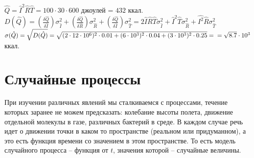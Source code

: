\documentclass[russian, 12pt, fleqn]{article}
\begin{document}
$\hat{Q} = \hat{I}^2 \hat{R} \hat{T} = 100\cdot30\cdot600$ джоулей = $432$ ккал.\\
$D(\hat{Q}) = (\frac{\delta \hat{Q}}{\delta \hat{I}}) \sigma^2_{\hat{I}} + (\frac{\delta \hat{Q}}{\delta \hat{R}}) \sigma^2_{\hat{R}} + (\frac{\delta \hat{Q}}{\delta \hat{I}}) \sigma^2_{\hat{T}} = 2\hat{I}\hat{R}\hat{T} \sigma_{\hat{I}}^2 + \hat{I}^2\hat{T} \sigma_{\hat{R}}^2  + \hat{I^2}\hat{R}\sigma_{\hat{T}}^2$\\
$\sigma(\hat{Q}) = \sqrt{D(\hat{Q})} = \sqrt{(2\cdot12\cdot 10^6)^2\cdot 0.01 + (6\cdot 10^3)^2 \cdot 0.04 + (3 \cdot 10^3)^2 \cdot 0.25} = \\ = \sqrt{8.7} \cdot 10^3$ ккал.
\section{Случайные процессы}
При изучении различных явлений мы сталкиваемся с процессами, течение которых заранее не можем предсказать: колебание высоты полета, движение отдельной молекулы в газе, различных бактерий в %
среде. В каждом случае речь идет о движении точки в каком то пространстве (реальном или придуманном), а это есть функция времени со значением в этом пространстве.
То есть модель случайного процесса -- функция от $t$, значения которой -- случайные величины.\\
\end{document}
